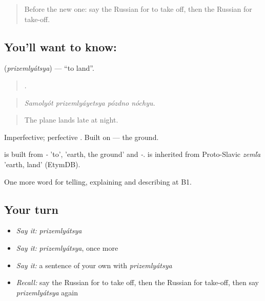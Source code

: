 \label{lesson:RU-C421-prizemlyatsya}



\begin{quote}
Before the new one: say the Russian for to take off, then the Russian for take-off.
\end{quote}

\subsection*{You'll want to know: }
\textbf{} (\emph{prizemlyátsya}) — \textquotedblleft{}to land\textquotedblright{}.

\begin{quote}
   .
\end{quote}

\begin{quote}
\emph{Samolyót prizemlyáyetsya pózdno nóchyu.}
\end{quote}

\begin{quote}
The plane lands late at night.
\end{quote}

Imperfective; perfective \emph{}. Built on \emph{} — the ground.

\begin{cousinweb}
\emph{} is built from \emph{-} 'to', \emph{} 'earth, the ground' and \emph{-}. \emph{} is inherited from Proto-Slavic \emph{zemľa} 'earth, land' (EtymDB).
\end{cousinweb}

\begin{grammarlens}[title={What you've built}]
One more word for telling, explaining and describing at B1.
\end{grammarlens}

\subsection*{Your turn}
\begin{itemize}
\raggedright
  \item \emph{Say it:} \emph{prizemlyátsya}
  \item \emph{Say it:} \emph{prizemlyátsya}, once more
  \item \emph{Say it:} a sentence of your own with \emph{prizemlyátsya}
  \item \emph{Recall:} say the Russian for to take off, then the Russian for take-off, then say \emph{prizemlyátsya} again
\end{itemize}

